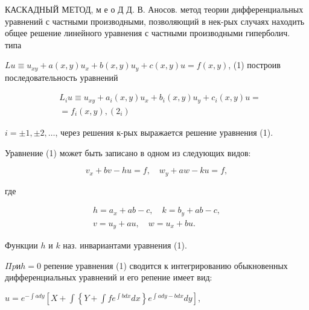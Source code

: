\documentclass[10pt]{article}
\begin{document}
КАСКАДНЫЙ МЕТОД, м е о Д Д. В. Аносов. метод теории дифференциальных уравнений с частными производными, позволяющий в нек-рых случаях находить общее решение линейного уравнения с частными производными гиперболич. типа



$L u \equiv u_{x y}+a(x, y) u_{x}+b(x, y) u_{y}+c(x, y) u=f(x, y)$, (1) построив последовательность уравнений



\[

\begin{aligned}

& L_{i} u \equiv u_{x y}+a_{i}(x, y) u_{x}+b_{i}(x, y) u_{y}+c_{i}(x, y) u= \\

&=f_{i}(x, y),\left(2_{i}\right)

\end{aligned}

\]



$i= \pm 1, \pm 2, \ldots$, через решения к-рых выражается решение уравнения (1).



Уравнение (1) может быть записано в одном из следующих видов:



\[

v_{x}+b v-h u=f, \quad w_{y}+a w-k u=f,

\]



где



\[

\begin{gathered}

h=a_{x}+a b-c, \quad k=b_{y}+a b-c, \\

v=u_{y}+a u, \quad w=u_{x}+b u .

\end{gathered}

\]



Функции $h$ и $k$ наз. инвариантами уравнения (1).



$\Pi p и h=0$ репение уравнения (1) сводится к интегрированию обыкновенных дифференциальных уравнений и его репение имеет вид:



$u=e^{-\int a d y}\left[X+\int\left\{Y+\int f e^{\int b d x} d x\right\} e^{\int a d y-b d x} d y\right]$,
\end{document}
